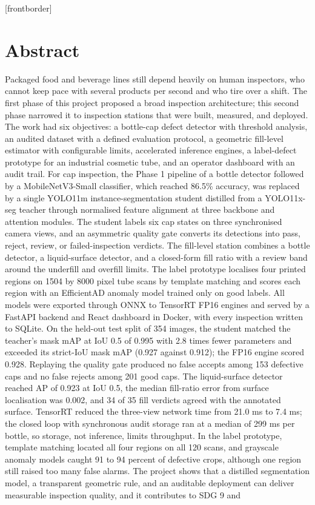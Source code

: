 \documentclass[12pt,a4paper]{report}
\theoremstyle{definition}
\theoremstyle{remark}
\begin{document}
\newpage
[frontborder]
\setcounter{page}{1}
\chapter*{\centering Abstract}
\noindent Packaged food and beverage lines still depend heavily on human inspectors, who cannot keep pace with several products per second and who tire over a shift. The first phase of this project proposed a broad inspection architecture; this second phase narrowed it to inspection stations that were built, measured, and deployed. The work had six objectives: a bottle-cap defect detector with threshold analysis, an audited dataset with a defined evaluation protocol, a geometric fill-level estimator with configurable limits, accelerated inference engines, a label-defect prototype for an industrial cosmetic tube, and an operator dashboard with an audit trail. For cap inspection, the Phase 1 pipeline of a bottle detector followed by a MobileNetV3-Small classifier, which reached 86.5\% accuracy, was replaced by a single YOLO11m instance-segmentation student distilled from a YOLO11x-seg teacher through normalised feature alignment at three backbone and attention modules. The student labels six cap states on three synchronised camera views, and an asymmetric quality gate converts its detections into pass, reject, review, or failed-inspection verdicts. The fill-level station combines a bottle detector, a liquid-surface detector, and a closed-form fill ratio with a review band around the underfill and overfill limits. The label prototype localises four printed regions on 1504 by 8000 pixel tube scans by template matching and scores each region with an EfficientAD anomaly model trained only on good labels. All models were exported through ONNX to TensorRT FP16 engines and served by a FastAPI backend and React dashboard in Docker, with every inspection written to SQLite. On the held-out test split of 354 images, the student matched the teacher's mask mAP at IoU 0.5 of 0.995 with 2.8 times fewer parameters and exceeded its strict-IoU mask mAP (0.927 against 0.912); the FP16 engine scored 0.928. Replaying the quality gate produced no false accepts among 153 defective caps and no false rejects among 201 good caps. The liquid-surface detector reached AP of 0.923 at IoU 0.5, the median fill-ratio error from surface localisation was 0.002, and 34 of 35 fill verdicts agreed with the annotated surface. TensorRT reduced the three-view network time from 21.0 ms to 7.4 ms; the closed loop with synchronous audit storage ran at a median of 299 ms per bottle, so storage, not inference, limits throughput. In the label prototype, template matching located all four regions on all 120 scans, and grayscale anomaly models caught 91 to 94 percent of defective crops, although one region still raised too many false alarms. The project shows that a distilled segmentation model, a transparent geometric rule, and an auditable deployment can deliver measurable inspection quality, and it contributes to SDG 9 and 
\end{document}
